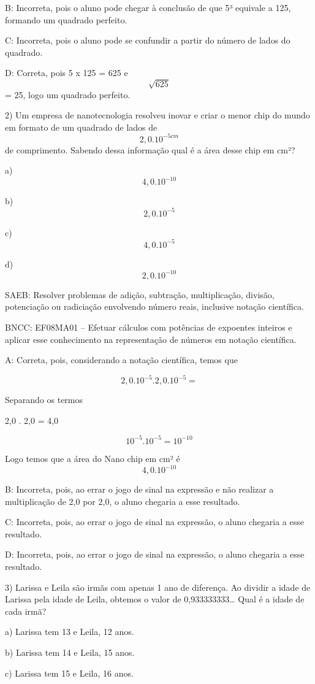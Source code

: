 B: Incorreta, pois o aluno pode chegar à conclusão de que 5³ equivale a
125, formando um quadrado perfeito.

C: Incorreta, pois o aluno pode se confundir a partir do número de lados
do quadrado.

D: Correta, pois 5 x 125 = 625 e \[\sqrt{625}\] = 25, logo um quadrado
perfeito.

2) Um empresa de nanotecnologia resolveu inovar e criar o menor chip do
mundo em formato de um quadrado de lados de \[2,0 . 10 ^{-5 cm}\] de
comprimento. Sabendo dessa informação qual é a área desse chip em cm²?

a) \[4,0 . 10^{-10}\]

b) \[2,0 . 10^{-5}\]

c) \[4,0 . 10^{-5}\]

d) \[2,0.10^{-10}\]

SAEB: Resolver problemas de adição, subtração, multiplicação, divisão,
potenciação ou radiciação envolvendo número reais, inclusive notação
científica.

BNCC: EF08MA01 -- Efetuar cálculos com potências de expoentes inteiros e
aplicar esse conhecimento na representação de números em notação
científica.

A: Correta, pois, considerando a notação científica, temos que

\[2,0 . 10^{-5} . 2,0 . 10^{-5} =\]

Separando os termos

2,0 . 2,0 = 4,0

\[10^{-5} . 10^{-5} = 10^{-10}\]

Logo temos que a área do Nano chip em cm² é \[4,0 . 10^{-10}\]

B: Incorreta, pois, ao errar o jogo de sinal na expressão e não realizar
a multiplicação de 2,0 por 2,0, o aluno chegaria a esse resultado.

C: Incorreta, pois, ao errar o jogo de sinal na expressão, o aluno
chegaria a esse resultado.

D: Incorreta, pois, ao errar o jogo de sinal na expressão, o aluno
chegaria a esse resultado.

3) Larissa e Leila são irmãs com apenas 1 ano de diferença. Ao dividir a
idade de Larissa pela idade de Leila, obtemos o valor de
0,933333333\ldots{} Qual é a idade de cada irmã?

a) Larissa tem 13 e Leila, 12 anos.

b) Larissa tem 14 e Leila, 15 anos.

c) Larissa tem 15 e Leila, 16 anos.

